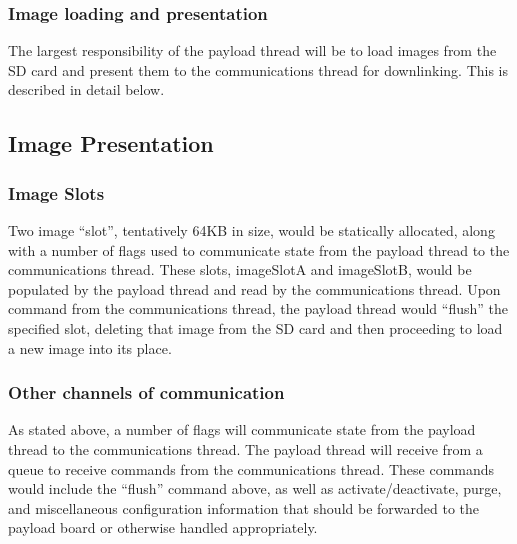 \documentclass{article}
\begin{document}
\subsubsection{Image loading and presentation}
The largest responsibility of the payload thread will be to load images from 
the SD card and present them to the communications thread for downlinking. This
is described in detail below.

\subsection{Image Presentation}
\subsubsection{Image Slots}
Two image ``slot'', tentatively 64KB in size, would be statically allocated,
along with a number of flags used to communicate state from the payload thread
to the communications thread. These slots, imageSlotA and imageSlotB, would be
populated by the payload thread and read by the communications thread. Upon
command from the communications thread, the payload thread would ``flush'' the
specified slot, deleting that image from the SD card and then proceeding to
load a new image into its place.

\subsubsection{Other channels of communication}
As stated above, a number of flags will communicate state from the payload
thread to the communications thread. The payload thread will receive from a 
queue to receive commands from the communications thread. These commands would
include the ``flush'' command above, as well as activate/deactivate, purge, and
miscellaneous configuration information that should be forwarded to the payload
board or otherwise handled appropriately.
\end{document}
